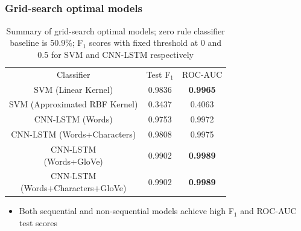 \documentclass{beamer}
\begin{document}
\subsection{}
\begin{framefont}{\footnotesize}
	\begin{frame}
		\frametitle{Grid-search optimal models}
		\begin{table}
			\centering
			\captionsetup{justification=centering}
			\bgroup
			\def\arraystretch{1.5}
			\begin{tabular}{|c|c|c|} \hline
				Classifier & Test F$_1$ & ROC-AUC \\ \hhline{|=|=|=|}
				SVM (Linear Kernel) & 0.9836 & \textbf{0.9965} \\ \hline
				SVM (Approximated RBF Kernel) & 0.3437 & 0.4063 \\ \hline
				CNN-LSTM (Words) & 0.9753 & 0.9972 \\ \hline
				CNN-LSTM (Words+Characters) & 0.9808 & 0.9975 \\ \hline
				\makecell{CNN-LSTM \\(Words+GloVe)} & 0.9902 & \textbf{0.9989} \\ \hline 
				\makecell{CNN-LSTM \\(Words+Characters+GloVe)} & 0.9902 & \textbf{0.9989} \\ \hline
			\end{tabular}
			\egroup
			\caption{Summary of grid-search optimal models; zero rule classifier baseline is 50.9\%; F$_1$ scores with fixed threshold at 0 and 0.5 for SVM and CNN-LSTM respectively}
		\end{table}
		\vspace{-10pt}
		\begin{itemize}
			\item Both sequential and non-sequential models achieve high F$_1$ and ROC-AUC test scores
		\end{itemize}
	\end{frame}
\end{framefont}
\end{document}
